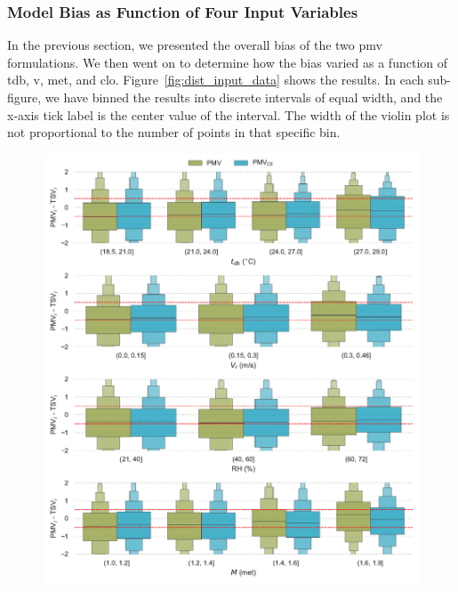 \subsubsection{Model Bias as Function of Four Input Variables}\label{subsec:model-bias-variable}
In the previous section, we presented the overall bias of the two \ac{pmv} formulations.
We then went on to determine how the bias varied as a function of \ac{tdb}, \ac{v}, \ac{met}, and \ac{clo}.
Figure~\ref{fig:dist_input_data} shows the results.
In each sub-figure, we have binned the results into discrete intervals of equal width, and the x-axis tick label is the center value of the interval. 
The width of the violin plot is not proportional to the number of points in that specific bin.
\begin{figure}[htb!]
    \centering
    \includegraphics[width=\textwidth]{figures/bias_models}
    \caption{}
    \label{fig:bias_models}
\end{figure}

